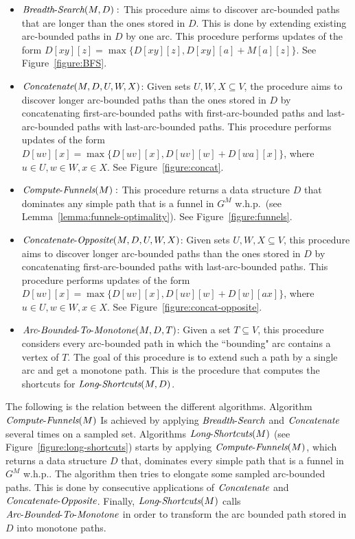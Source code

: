 \documentclass[11pt]{article}
\newcommand{\Concat}{\mbox{{\it Concatenate}}}
\newcommand{\CO}{\mbox{{\it Concatenate}-{\it Opposite}}}
\newcommand{\LS}{\mbox{{\it Long}-{\it Shortcuts}}}
\newcommand{\BFS}{\mbox{{\it Breadth}-{\it Search}}}
\newcommand{\ComputeF}{\mbox{{\it Compute}-{\it Funnels}}}
\newcommand{\Extend}{\mbox{{\it Arc}-{\it Bounded}-{\it To}-{\it Monotone}}}
\begin{document}
\begin{itemize}
    \item  $\BFS(M,D):$ This procedure aims to discover arc-bounded paths that are longer than the ones stored in $D$. This is done by extending existing arc-bounded paths in $D$ by one arc. This procedure performs updates of the form $D[xy][z] = \max \{D[xy][z], D[xy][a] + M[a][z]\}$. See Figure~\ref{figure:BFS}. 
    \item $\Concat(M,D,U,W,X)$: Given sets $U,W,X\subseteq V$, the procedure aims to discover longer arc-bounded paths than the ones stored in $D$ by concatenating first-arc-bounded paths with first-arc-bounded paths and last-arc-bounded paths with last-arc-bounded paths. This procedure performs updates of the form $D[uv][x] = \max \{D[uv][x], D[uv][w]+D[wa][x]\}$, where $u\in U, w\in W, x\in X$. See Figure~\ref{figure:concat}.
    \item $\ComputeF(M):$ This procedure returns a data structure $D$ that dominates any simple path that is a funnel in $G^M$ w.h.p.\ (see Lemma~\ref{lemma:funnels-optimality}). See Figure~\ref{figure:funnels}.
    \item $\CO(M,D,U,W,X)$: Given sets $U,W,X\subseteq V$, this procedure aims to discover longer arc-bounded paths than the ones stored in $D$ by concatenating first-arc-bounded paths with last-arc-bounded paths. This procedure performs updates of the form $D[uv][x] =\max \{D[uv][x], D[uv][w]+D[w][ax]\}$, where $u\in U, w\in W, x\in X$. See Figure~\ref{figure:concat-opposite}.
    \item $\Extend(M,D,T)$: Given a set $T\subseteq V$, this procedure considers  every arc-bounded path in which the ``bounding" arc contains a vertex of $T$. The goal of this procedure is to extend such a path by a single arc and get a monotone path. This is the procedure that computes the shortcuts for $\LS(M,D)$.
\end{itemize}


The following is the relation between the different algorithms.
Algorithm $\ComputeF(M)$ Is achieved by applying $\BFS{}$ and $\Concat$ several times on a sampled set. 
Algorithms $\LS(M)$ (see Figure~\ref{figure:long-shortcuts}) starts by applying $\ComputeF(M)$, which returns a data structure $D$ that,  dominates every simple path that is a funnel in $G^M$ w.h.p.. The algorithm then tries to elongate some sampled arc-bounded paths. This is done by consecutive applications of $\Concat$ and $\CO$. Finally, $\LS(M)$ calls $\Extend$ in order to transform the arc bounded path stored in $D$ into monotone paths. 
\end{document}
